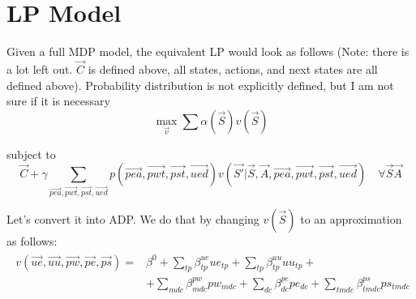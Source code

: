 \documentclass{article}
\begin{document}
\section{LP Model}

Given a full MDP model, the equivalent LP would look as follows 
(Note: there is a lot left out. $\vec{C}$ is defined above, all states, actions, and next states are all defined above). Probability distribution is not explicitly defined, but I am not sure if it is necessary
\begin{equation}
	\max_{\vec{v}} \sum \alpha (\vec{S}) v(\vec{S}) 
\end{equation}

subject to
\begin{equation}
	\vec{C} + \gamma \sum_{\vec{pea}, \vec{pwt}, \vec{pst}, \vec{ued}} p(\vec{pea}, \vec{pwt}, \vec{pst}, \vec{ued}) v( \vec{S'} | \vec{S}, \vec{A}, \vec{pea}, \vec{pwt}, \vec{pst}, \vec{ued}) \quad \forall \vec{S} \vec{A}
\end{equation}

Let's convert it into ADP. We do that by changing $v(\vec{S})$ to an approximation as follows:
\begin{align} \begin{split}
	v(\vec{ue}, \vec{uu}, \vec{pw}, \vec{pe}, \vec{ps}) =  & \beta^0 +
		\sum_{tp} \beta_{tp}^{ue} ue_{tp} +
		\sum_{tp} \beta_{tp}^{uu} uu_{tp} + \\
		& + \sum_{mdc} \beta_{mdc}^{pw} pw_{mdc}  + 
		\sum_{dc} \beta_{dc}^{pe} pe_{dc} + 
		\sum_{tmdc} \beta_{tmdc}^{ps} ps_{tmdc}
\end{split} \end{align}
\end{document}

